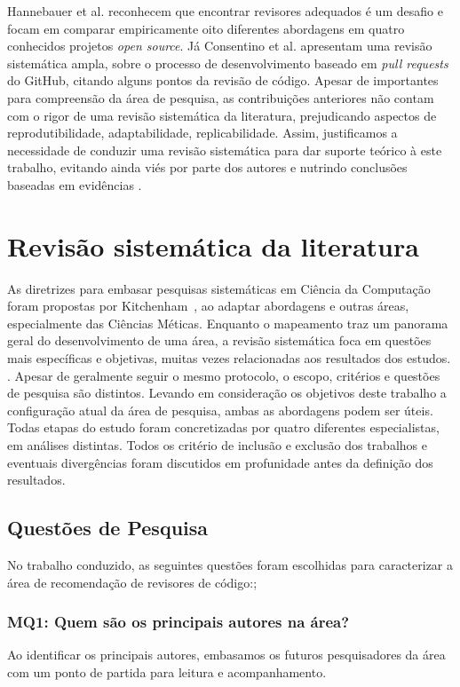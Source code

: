 \documentclass[12pt,openany,oneside,a4paper,english,brazil]{abntbibufjf}
\begin{document}
Hannebauer et al. \cite{hannebauer2016} reconhecem que encontrar revisores adequados é um desafio e focam em comparar empiricamente oito diferentes abordagens em quatro conhecidos projetos \textit{open source}. Já Consentino et al. \cite{cosentino2017} apresentam uma revisão sistemática ampla, sobre o processo de desenvolvimento baseado em \textit{pull requests} do GitHub, citando alguns pontos da revisão de código. Apesar de importantes para compreensão da área de pesquisa, as contribuições anteriores não contam com o rigor de uma revisão sistemática da literatura, prejudicando aspectos de reprodutibilidade, adaptabilidade, replicabilidade. Assim, justificamos a necessidade de conduzir uma revisão sistemática para dar suporte teórico à este trabalho, evitando ainda viés por parte dos autores e nutrindo conclusões baseadas em evidências \cite{wohlin2012}.


\section{Revisão sistemática da literatura}\label{sec:revisao_sistematica}

As diretrizes para embasar pesquisas sistemáticas em Ciência da Computação foram propostas por Kitchenham~\cite{kitchenham2004}, ao adaptar abordagens e outras áreas, especialmente das Ciências Méticas. Enquanto o mapeamento traz um panorama geral do desenvolvimento de uma área, a revisão sistemática foca em questões mais específicas e objetivas, muitas vezes relacionadas aos resultados dos estudos. \cite{wohlin2012}. Apesar de geralmente seguir o mesmo protocolo, o escopo, critérios e questões de pesquisa são distintos. Levando em consideração os objetivos deste trabalho a configuração atual da área de pesquisa, ambas as abordagens podem ser úteis. Todas etapas do estudo foram concretizadas por quatro diferentes especialistas, em análises distintas. Todos os critério de inclusão e exclusão dos trabalhos e eventuais divergências foram discutidos em profunidade antes da definição dos resultados.

\subsection{Questões de Pesquisa}

No trabalho conduzido, as seguintes questões foram escolhidas para caracterizar a área de recomendação de revisores de código:;

\subsubsection{\textbf{MQ1: Quem são os principais autores na área?}} Ao identificar os principais autores, embasamos os futuros pesquisadores da área com um ponto de partida para leitura e acompanhamento.
\end{document}
